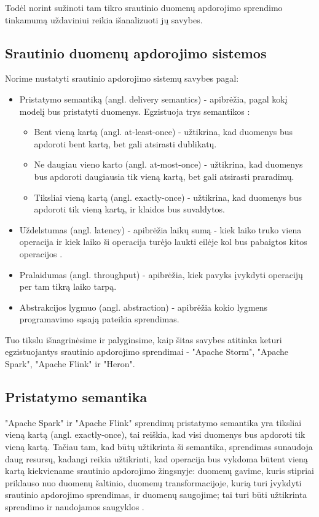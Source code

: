 \documentclass{VUMIFPSbakalaurinis}
\begin{document}
Todėl norint sužinoti tam tikro srautinio duomenų apdorojimo sprendimo tinkamumą uždaviniui reikia išanalizuoti jų savybes.   
\subsection{Srautinio duomenų apdorojimo sistemos}

Norime nustatyti srautinio apdorojimo sistemų savybes pagal:
\begin{itemize}
    \item Pristatymo semantiką (angl. delivery semantics) - apibrėžia, pagal kokį modelį bus pristatyti duomenys. Egzistuoja trys semantikos \cite{ensar20}: 
    \begin{itemize}
        \item Bent vieną kartą (angl. at-least-once) - užtikrina, kad duomenys bus apdoroti bent kartą, bet gali atsirasti dublikatų. 
        \item Ne daugiau vieno karto (angl. at-most-once) - užtikrina, kad duomenys bus apdoroti daugiausia tik vieną kartą, bet gali atsirasti praradimų. 
        \item Tiksliai vieną kartą (angl. exactly-once) - užtikrina, kad duomenys bus apdoroti tik vieną kartą, ir klaidos bus suvaldytos.
    \end{itemize}
    \item Uždelstumas (angl. latency) - apibrėžia laikų sumą - kiek laiko truko viena operacija ir kiek laiko ši operacija turėjo laukti eilėje kol bus pabaigtos kitos operacijos \cite{karimov2018benchmarking}.
    \item Pralaidumas (angl. throughput) - apibrėžia, kiek pavyks įvykdyti operacijų per tam tikrą laiko tarpą.
    \item Abstrakcijos lygmuo (angl. abstraction) - apibrėžia kokio lygmens programavimo sąsają pateikia sprendimas.
\end{itemize}
Tuo tikslu išnagrinėsime ir palyginsime, kaip šitas savybes atitinka keturi egzistuojantys srautinio apdorojimo sprendimai - "Apache Storm", "Apache Spark", "Apache Flink" ir "Heron".

\subsection{Pristatymo semantika}
"Apache Spark" ir "Apache Flink" sprendimų pristatymo semantika yra tiksliai vieną kartą (angl. exactly-once), tai reiškia, kad visi duomenys bus apdoroti tik vieną kartą. Tačiau tam, kad būtų užtikrinta ši semantika, sprendimas sunaudoja daug resursų, kadangi reikia užtikrinti, kad operacija bus vykdoma būtent vieną kartą kiekviename srautinio apdorojimo žingsnyje: duomenų gavime, kuris stipriai priklauso nuo duomenų šaltinio, duomenų transformacijoje, kurią turi įvykdyti srautinio apdorojimo sprendimas, ir duomenų saugojime; tai turi būti užtikrinta sprendimo ir naudojamos saugyklos \cite{zhang20}.\par
\end{document}
